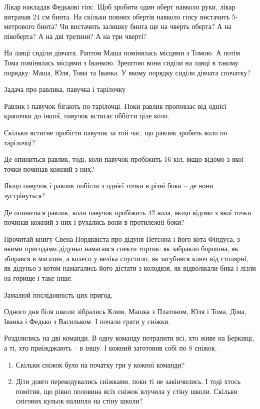 \problem
Лікар накладав Федькові гіпс.
Щоб зробити один оберт навколо руки, лікар витрачав 24 см бинта.
На скільки повних обертів навколо гіпсу вистачить 5-метрового бинта?
Чи вистачить залишку бинта ще на чверть оберта?
А на півоберта?
А на дві третини?
А на три чверті?


\problem
На лавці сиділи дівчата. Раптом Маша помінялась місцями з Томою.
А потім Тома помінялась місцями з Іванкою.
Зрештою вони сиділи на лавці в такому порядку: Маша, Юля, Тома та Іванка.
У якому порядку сиділи дівчата спочатку?


\problem
Задача про равлика, павучка і тарілочку

Равлик і павучок бігають по тарілочці.
Поки равлик проповзає від однієї крапочки до іншої,
павучок встигає оббігти ціле коло. 

Скільки встигне пробігти павучок за той час,
що равлик зробить коло по тарілочці? 

Де опиниться равлик, тоді, коли павучок пробіжить 16 кіл,
якщо відомо з якої точки починав кожний з них? 

Якщо павучок і равлик побігли з однієї точки в різні боки – 
де вони зустрінуться? 

Де опиниться равлик, коли павучок пробіжить 42 кола, якщо відомо
з якої точки починав кожний з них і рухались вони в протилежні боки?


\problem
Прочитай книгу Свена Нордквіста про дідуня Петсона і його кота Фіндуса,
з якими пригодами дідуньо намагався спекти тортик: як забракло борошна,
як збирався в магазин, а колесо у веліка спустило, як загубився ключ
від столярні, як дідуньо з котом намагались його дістати з колодязя,
як відволікали бика і лізли на горище і таке інше.

Замалюй послідовність цих пригод.


\problem
Одного дня біля школи зібрались Клим, Машка з Платоном, Юля і Тома,
Діма, Іванка і Федько з Васильком. І почали грати у сніжки.

Розділились на дві команди. В одну команду потрапити всі,
хто живе на Берківці, а ті, хто приїжджають – в іншу.
І кожний заготовив собі по 8 сніжок.

\begin{enumerate}
    \item Скільки сніжок було на початку гри у кожної команди?
    \item Діти довго перекодувались сніжками, поки ті не закінчились.
    І тоді хтось помітив, що рівно половина всіх сніжок влучила у стіну школи.
    Скільки снігових кульок налипло на стіну школи?
\end{enumerate}


